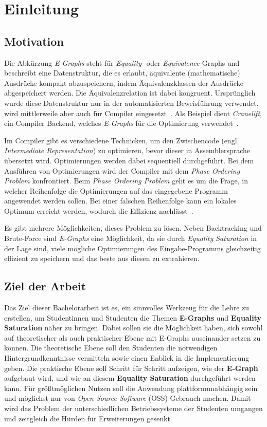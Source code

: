 \section{Einleitung}\label{sec:einleitung}

\subsection{Motivation}

\noindent Die Abkürzung \textit{E-Graphs} steht für \textit{Equality-} oder \textit{Equivalence-}Graphs und beschreibt eine Datenstruktur, die es
 erlaubt, äquivalente (mathematische) Ausdrücke kompakt abzuspeichern, indem
Äquivalenzklassen der Ausdrücke abgespeichert werden. Die Äquivalenzrelation ist dabei kongruent. 
Ursprünglich wurde diese Datenstruktur nur in der automatisierten Beweisführung verwendet, wird mittlerweile aber auch für Compiler eingesetzt~\cite{2021-egg}.
Als Beispiel dient \textit{Cranelift}, ein Compiler Backend, welches \textit{E-Graphs} für die Optimierung verwendet~\cite{cranelift}.

\noindent Im Compiler gibt es verschiedene Technicken, um den Zwischencode (engl. \textit{Intermediate Representation}) zu optimieren, bevor dieser in 
Assemblersprache übersetzt wird. Optimierungen werden dabei sequentiell durchgeführt. Bei dem Ausführen von Optimierungen wird der Compiler mit dem \textit{Phase Ordering Problem}
konfrontiert. Beim \textit{Phase Ordering Problem} geht es um die Frage, in welcher Reihenfolge die Optimierungen auf das eingegebene 
Programm angewendet werden sollen. Bei einer falschen Reihenfolge kann ein lokales Optimum erreicht werden, wodurch die Effizienz nachlässt~\cite{phaseorder-2009}.

\noindent Es gibt mehrere Möglichkeiten, dieses Problem zu lösen. Neben Backtracking und Brute-Force sind \textit{E-Graphs} eine Möglichkeit, da sie durch \textit{Equality Saturation}
in der Lage sind, viele mögliche Optimierungen des Eingabe-Programms gleichzeitig effizient zu speichern und das beste aus diesen zu extrahieren.

\subsection{Ziel der Arbeit}

Das Ziel dieser Bachelorarbeit ist es, ein sinnvolles Werkzeug für die Lehre zu erstellen,
um Studentinnen und Studenten die Themen \textbf{E-Graphs} und \textbf{Equality Saturation} näher zu bringen.
Dabei sollen sie die Möglichkeit haben, sich sowohl auf theoretischer als auch praktischer Ebene mit E-Graphs auseinander setzen zu können.
Die theoretische Ebene soll den Studenten die notwendigen Hintergrundkenntnisse vermitteln sowie einen Enblick in die Implementierung geben.
Die praktische Ebene soll Schritt für Schritt aufzeigen, wie der \textbf{E-Graph} aufgebaut wird, und wie an diesem \textbf{Equality Saturation} durchgeführt werden kann.
Für grö{\ss}tmöglichen Nutzen soll die Anwendung plattformunabhängig sein und möglichst nur von \textit{Open-Source-Software} (OSS) Gebrauch machen.
Damit wird das Problem der unterschiedlichen Betriebssysteme der Studenten umgangen und zeitgleich die Hürden für Erweiterungen gesenkt.

